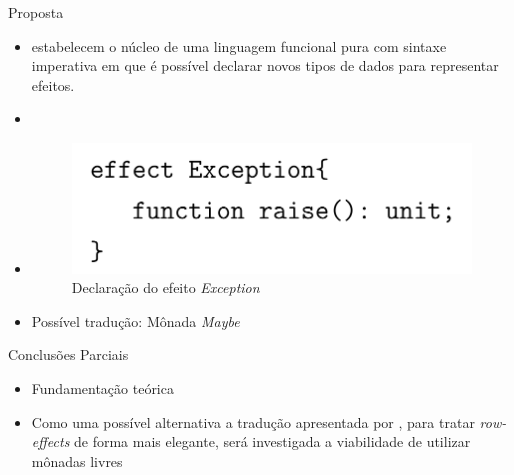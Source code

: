 \begin{frame}{Proposta}
    \begin{itemize}
        \item {} estabelecem o núcleo de uma linguagem funcional pura com sintaxe imperativa em que é possível declarar novos tipos de dados para representar efeitos.

        \item []

        \item [] \begin{figure}
            \centering
            \includegraphics[width=.6\textwidth]{Figuras/excep.png}
            \caption{Declaração do efeito \textit{Exception}}
            \label{fig:exc}
        \end{figure}

        \item Possível tradução: Mônada \textit{Maybe}

    \end{itemize}
\end{frame}

\begin{frame}{Conclusões Parciais}
    \begin{itemize}
        \item Fundamentação teórica
        \item Como uma possível alternativa a tradução apresentada por , para tratar \textit{row-effects} de forma mais elegante, será investigada a viabilidade de utilizar mônadas livres \cite{kiselyov2015freer}
    \end{itemize}
\end{frame}